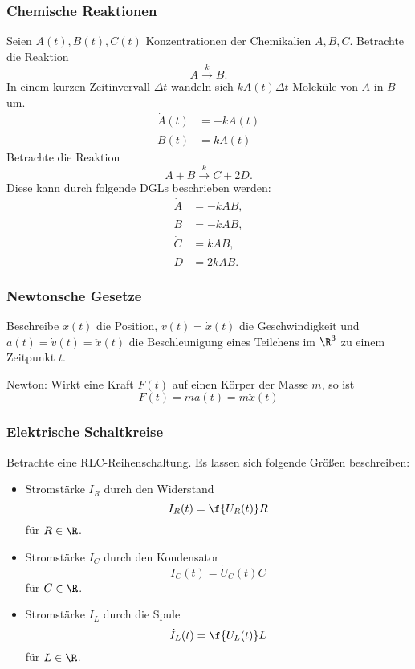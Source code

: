 \documentclass[
]{mycourse}
\begin{document}
\subsubsection{Chemische Reaktionen}


Seien $A(t), B(t), C(t)$ Konzentrationen der Chemikalien $A,B,C$.
Betrachte die Reaktion
\[
	A \overset{k}{\longrightarrow} B.
\]
In einem kurzen Zeitinvervall $\Delta t$ wandeln sich $k A(t) \Delta t$ Moleküle von $A$ in $B$ um.
\begin{align*}
	\dot A(t) &= -k A(t) \\
	\dot B(t) &= k A(t)
\end{align*}
Betrachte die Reaktion
\[
	A + B \overset{k}{\longrightarrow} C + 2D.
\]
Diese kann durch folgende DGLs beschrieben werden:
\begin{align*}
	\dot A &= -kAB,  \\
	\dot B &= -kAB, \\
	\dot C &= kAB, \\
	\dot D &= 2kAB.
\end{align*}


\subsubsection{Newtonsche Gesetze}

\fixme[Bild]

Beschreibe $x(t)$ die Position, $v(t) = \dot x(t)$ die Geschwindigkeit und $a(t) = \dot v(t) = \ddot x(t)$ die Beschleunigung eines Teilchens im $\R^3$ zu einem Zeitpunkt $t$.

Newton: Wirkt eine Kraft $F(t)$ auf einen Körper der Masse $m$, so ist
\[
	F(t) = m a(t) = m\ddot x(t)
\]


\subsubsection{Elektrische Schaltkreise}


Betrachte eine RLC-Reihenschaltung.
Es lassen sich folgende Größen beschreiben:
\begin{itemize}
	\item
		Stromstärke $I_R$ durch den Widerstand
		\[
			I_R(t) = \f {U_R(t)}R
		\]
		für $R \in \R$.
	\item
		Stromstärke $I_C$ durch den Kondensator
		\[
			I_C(t) = \dot  U_C(t) C
		\]
		für $C \in \R$.
	\item
		Stromstärke $I_L$ durch die Spule
		\[
			\dot I_L(t) = \f {U_L(t)}L
		\]
		für $L \in \R$.
\end{itemize}
\end{document}
